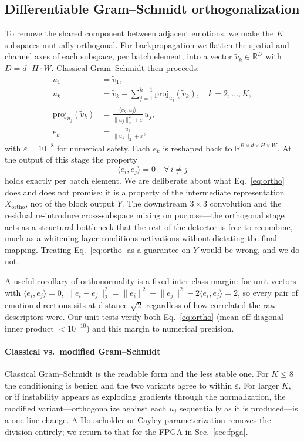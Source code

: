 \documentclass[journal]{IEEEtran}
\begin{document}
\subsection{Differentiable Gram--Schmidt orthogonalization}
To remove the shared component between adjacent emotions, we make the $K$
subspaces mutually orthogonal. For backpropagation we flatten the spatial and
channel axes of each subspace, per batch element, into a vector
$\tilde{v}_k\in\mathbb{R}^{D}$ with $D=d\cdot H\cdot W$. Classical
Gram--Schmidt then proceeds:
\begin{align}
u_1 &= \tilde{v}_1, \\
u_k &= \tilde{v}_k - \sum_{j=1}^{k-1}\text{proj}_{u_j}(\tilde{v}_k),
       \quad k=2,\dots,K, \\
\text{proj}_{u_j}(\tilde{v}_k) &= \frac{\langle\tilde{v}_k,u_j\rangle}
       {\lVert u_j\rVert_2^2+\varepsilon}\,u_j, \\
e_k &= \frac{u_k}{\lVert u_k\rVert_2+\varepsilon},
\end{align}
with $\varepsilon=10^{-8}$ for numerical safety. Each $e_k$ is reshaped back to
$\mathbb{R}^{B\times d\times H\times W}$. At the output of this stage the
property
\begin{equation}\label{eq:ortho}
\langle e_i,e_j\rangle = 0 \quad \forall\, i\neq j
\end{equation}
holds exactly per batch element. We are deliberate about what
Eq.~\eqref{eq:ortho} does and does not promise: it is a property of the
intermediate representation $X_\text{ortho}$, not of the block output $Y$. The
downstream $3\times3$ convolution and the residual re-introduce cross-subspace
mixing on purpose---the orthogonal stage acts as a structural bottleneck that
the rest of the detector is free to recombine, much as a whitening layer
conditions activations without dictating the final mapping. Treating
Eq.~\eqref{eq:ortho} as a guarantee on $Y$ would be wrong, and we do not.

A useful corollary of orthonormality is a fixed inter-class margin: for unit
vectors with $\langle e_i,e_j\rangle=0$, $\lVert e_i-e_j\rVert_2^2 =
\lVert e_i\rVert^2+\lVert e_j\rVert^2-2\langle e_i,e_j\rangle = 2$, so every
pair of emotion directions sits at distance $\sqrt{2}$ regardless of how
correlated the raw descriptors were. Our unit tests verify both
Eq.~\eqref{eq:ortho} (mean off-diagonal inner product $<10^{-10}$) and this
margin to numerical precision.

\paragraph*{Classical vs.\ modified Gram--Schmidt}
Classical Gram--Schmidt is the readable form and the less stable one. For
$K\le 8$ the conditioning is benign and the two variants agree to within
$\varepsilon$. For larger $K$, or if instability appears as exploding
gradients through the normalization, the modified variant---orthogonalize
against each $u_j$ sequentially as it is produced---is a one-line change. A
Householder or Cayley parameterization removes the division entirely; we return
to that for the FPGA in Sec.~\ref{sec:fpga}.
\end{document}
